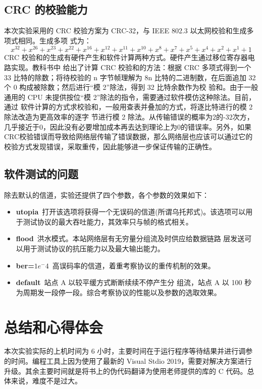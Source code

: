 \documentclass[14pt]{article} %
\begin{document}
\subsection{CRC 的校验能力}
本次实验采用的 CRC 校验方案为 CRC-32，与 IEEE 802.3 以太网校验和生成多项式相同。生成多项
式为：
$$x^{32}+x^{26}+x^{23}+x^{22}+x^{16}+x^{12}+x^{11}+x^{10}+x^{8}+x^{7}+x^{5}+x^{4}+x^{2}+x^{1}+1$$
CRC 校验和的生成有硬件产生和软件计算两种方式。硬件产生通过移位寄存器电路实现。教科书中
给出了计算 CRC 校验和的方法：根据 CRC 多项式得到一个 33 比特的除数；将待校验的 n 字节帧理解为
8n 比特的二进制数，在后面追加 32 个 0 构成被除数；然后进行“模 2”除法，得到 32 比特余数作为校
验和。由于一般通用的 CPU 未提供按位“模 2”除法的指令，需要通过软件模仿这种除法。目前，通过
软件计算的方式求校验和，一般用查表并叠加的方式，将逐比特进行的模 2 除法改造为更高效率的逐字
节进行模 2 除法。从传输错误的概率为2的-32次方，几乎接近于0，因此没有必要增加成本再去达到理论上为0的错误率。另外，如果CRC校验错误而导致给网络层传输了错误数据，那么网络层也应该可以通过它的校验方式发现错误，采取重传，因此能够进一步保证传输的正确性。
\subsection{软件测试的问题}
除去默认的信道，实验还提供了四个参数，各个参数的效果如下：
\begin{itemize}
	\item \textbf{\textendash utopia}\ 打开该选项将获得一个无误码的信道(所谓乌托邦式)。该选项可以用于测试协议的最大吞吐能力，其效率只与帧的格式相关。
	\item \textbf{\textendash flood}\ 洪水模式。本站网络层有无穷量分组流及时供应给数据链路
	层发送可以用于测试协议的抗压能力以及最大输出能力。
	\item \textbf{\textendash ber=$1e^-4$}\ 高误码率的信道，着重考察协议的重传机制的效果。
	\item \textbf{default}\ 站点 A 以较平缓方式断断续续不停产生分
	组流，站点 A 以 100 秒为周期发一段停一段。综合考察协议的性能以及参数的选取效果。
\end{itemize}
\section{总结和心得体会}
本次实验实际的上机时间为 6 小时，主要时间在于运行程序等待结果并进行调参的时间。编程工具上因为使用了最新的 Visual Stdio 2019，需要对解决方案进行升级。其余主要时间就是将书上的伪代码翻译为使用老师提供的库的 C 代码。总体来说，难度不是过大。

\appendix
\end{document}
